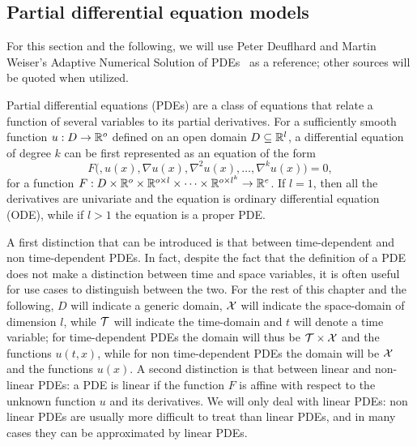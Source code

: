 \subsection{Partial differential equation models} \label{sec:PDE}

For this section and the following, we will use Peter Deuflhard and Martin Weiser's Adaptive Numerical Solution of PDEs~\cite{DeuflhardWeiser2012} as a reference; other sources will be quoted when utilized.

Partial differential equations (PDEs) are a class of equations that relate a function of several variables to its partial derivatives.
For a sufficiently smooth function $u : D \rightarrow \mathbb{R}^o$ defined on an open domain $D \subseteq \mathbb{R}^l$, a differential equation of degree $k$ can be first represented as an equation of the form
\[
    F\big(,u(x), \nabla u(x), \nabla^2 u(x), \dots, \nabla^k u(x)\big) = 0,
\]
for a function $F: D \times \mathbb{R}^o \times \mathbb{R}^{o \times l} \times \dots \times \mathbb{R}^{o \times l^k} \rightarrow \mathbb{R}^e$.
If $l =1$, then all the derivatives are univariate and the equation is ordinary differential equation (ODE), while if $l > 1$ the equation is a proper PDE.

A first distinction that can be introduced is that between time-dependent and non time-dependent PDEs.
In fact, despite the fact that the definition of a PDE does not make a distinction between time and space variables, it is often useful for use cases to distinguish between the two.
For the rest of this chapter and the following, $D$ will indicate a generic domain, $\mathcal X$ will indicate the space-domain of dimension $l$, while $\mathcal T$ will indicate the time-domain and $t$ will denote a time variable; for time-dependent PDEs the domain will thus be $\mathcal T \times \mathcal X$ and the functions $u(t,x)$, while for non time-dependent PDEs the domain will be $\mathcal X$ and the functions $u(x)$.
A second distinction is that between linear and non-linear PDEs: a PDE is linear if the function $F$ is affine with respect to the unknown function $u$ and its derivatives.
We will only deal with linear PDEs: non linear PDEs are usually more difficult to treat  than linear PDEs, and in many cases they can be approximated by linear PDEs.

